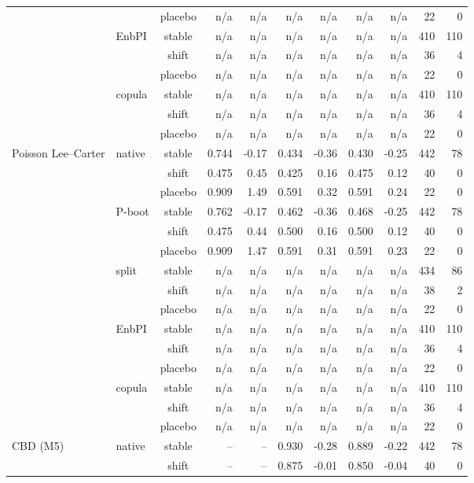 {\begin{longtable}{@{}llcrrrrrrrr@{}}
 &  & placebo & n/a & n/a & n/a & n/a & n/a & n/a & 22 & 0 \\
 & EnbPI & stable & n/a & n/a & n/a & n/a & n/a & n/a & 410 & 110 \\
 &  & shift & n/a & n/a & n/a & n/a & n/a & n/a & 36 & 4 \\
 &  & placebo & n/a & n/a & n/a & n/a & n/a & n/a & 22 & 0 \\
 & copula & stable & n/a & n/a & n/a & n/a & n/a & n/a & 410 & 110 \\
 &  & shift & n/a & n/a & n/a & n/a & n/a & n/a & 36 & 4 \\
 &  & placebo & n/a & n/a & n/a & n/a & n/a & n/a & 22 & 0 \\
\addlinespace[2pt]
Poisson Lee--Carter & native & stable & 0.744 & -0.17 & 0.434 & -0.36 & 0.430 & -0.25 & 442 & 78 \\
 &  & shift & 0.475 & 0.45 & 0.425 & 0.16 & 0.475 & 0.12 & 40 & 0 \\
 &  & placebo & 0.909 & 1.49 & 0.591 & 0.32 & 0.591 & 0.24 & 22 & 0 \\
 & P-boot & stable & 0.762 & -0.17 & 0.462 & -0.36 & 0.468 & -0.25 & 442 & 78 \\
 &  & shift & 0.475 & 0.44 & 0.500 & 0.16 & 0.500 & 0.12 & 40 & 0 \\
 &  & placebo & 0.909 & 1.47 & 0.591 & 0.31 & 0.591 & 0.23 & 22 & 0 \\
 & split & stable & n/a & n/a & n/a & n/a & n/a & n/a & 434 & 86 \\
 &  & shift & n/a & n/a & n/a & n/a & n/a & n/a & 38 & 2 \\
 &  & placebo & n/a & n/a & n/a & n/a & n/a & n/a & 22 & 0 \\
 & EnbPI & stable & n/a & n/a & n/a & n/a & n/a & n/a & 410 & 110 \\
 &  & shift & n/a & n/a & n/a & n/a & n/a & n/a & 36 & 4 \\
 &  & placebo & n/a & n/a & n/a & n/a & n/a & n/a & 22 & 0 \\
 & copula & stable & n/a & n/a & n/a & n/a & n/a & n/a & 410 & 110 \\
 &  & shift & n/a & n/a & n/a & n/a & n/a & n/a & 36 & 4 \\
 &  & placebo & n/a & n/a & n/a & n/a & n/a & n/a & 22 & 0 \\
\addlinespace[2pt]
CBD (M5) & native & stable & -- & -- & 0.930 & -0.28 & 0.889 & -0.22 & 442 & 78 \\
 &  & shift & -- & -- & 0.875 & -0.01 & 0.850 & -0.04 & 40 & 0 \\

\end{longtable}}
